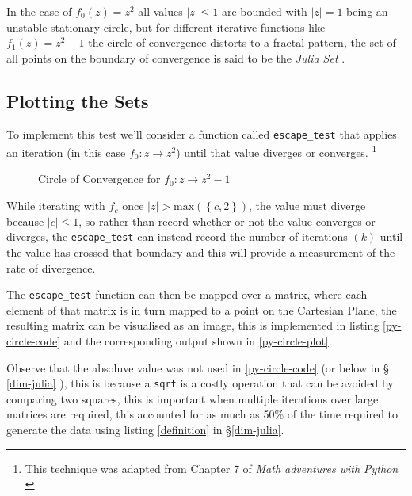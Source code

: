 \documentclass[a4paper,11pt,twoside]{article}
\begin{document}
In the case of \(f_{0}(z) = z^{2}\) all values \(\left\lvert z  \right \rvert \leq 1\) are bounded with \(\left\lvert z  \right \rvert = 1\) being an unstable stationary circle, but for different iterative functions like \(f_{1}(z) = z^{2} - 1\) the circle of convergence distorts to a fractal pattern, the set of all points on the boundary of convergence is said to be the \emph{Julia Set} \cite[Ch. 14]{peitgenChaosFractalsNew2004}.

\subsection{Plotting the Sets}
\label{sec:org587fad1}
To implement this test we'll consider a function called \texttt{escape\_test} that applies an
iteration (in this case \(f_{0}: z \rightarrow z^{2}\)) until that value diverges or converges. \footnote{This technique was adapted from Chapter 7 of \emph{Math adventures with Python} \cite{farrellMathAdventuresPython2019}}


\begin{figure}[htbp]
\centering

\caption{\label{py-jl-1-plot}Circle of Convergence for \(f_{0}: z \rightarrow z^{2} - 1\)}
\end{figure}


While iterating with \(f_{c}\) once \(\left\lvert z \right\rvert >
\mathrm{max}\left(\left\{c, 2\right\}\right)\), the value must diverge because
\(\left\lvert c \right\rvert \leq 1\), so rather than record whether or not the
value converges or diverges, the \texttt{escape\_test} can instead record the number of
iterations \((k)\) until the value has crossed that boundary and this will provide
a measurement of the rate of divergence.

The \texttt{escape\_test} function can then be mapped over a matrix, where each element
of that matrix is in turn mapped to a point on the Cartesian Plane, the resulting matrix
can be visualised as an image, this is implemented in listing
\ref{py-circle-code} and the corresponding output shown in \ref{py-circle-plot}.

Observe that the absoluve value was not used in \ref{py-circle-code} (or below in \S
\ref{dim-julia} ), this is because a \texttt{sqrt} is a costly operation that can be avoided
by comparing two squares, this is important when multiple iterations over large
matrices are required, this accounted for as much as 50\% of the time required to
generate the data using listing \ref{definition} in \S \ref{dim-julia}.
\end{document}
